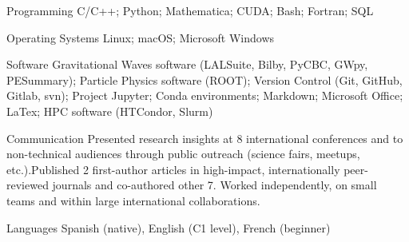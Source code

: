 \begin{cvskills}

  \cvskill
    {Programming} %
    {\vspace{-10pt}C/C++; Python; Mathematica; CUDA; Bash; Fortran; SQL} %

  \cvskill
    {Operating Systems} %
    {\vspace{-10pt}Linux; macOS; Microsoft Windows} %

  \cvskill
    {Software} %
    {\vspace{-10pt} Gravitational Waves software (LALSuite, Bilby, PyCBC, GWpy, PESummary); \newline Particle Physics software (ROOT); Version Control (Git, GitHub, Gitlab, svn); \newline Project Jupyter; Conda environments;  Markdown; Microsoft Office; LaTex; \newline HPC software (HTCondor, Slurm)} %

  \cvskill
    {Communication} %
    { \vspace{-10pt} Presented research insights at 8 international conferences and to non-technical audiences through public outreach (science fairs, meetups, etc.).\newline Published 2 first-author articles in high-impact, internationally peer-reviewed journals and co-authored other 7. \newline Worked independently, on small teams and within large international collaborations.} %

  \cvskill
    {Languages} %
    {\vspace{-10pt}Spanish (native), English (C1 level), French (beginner)} %

\end{cvskills}\vspace{10pt}
